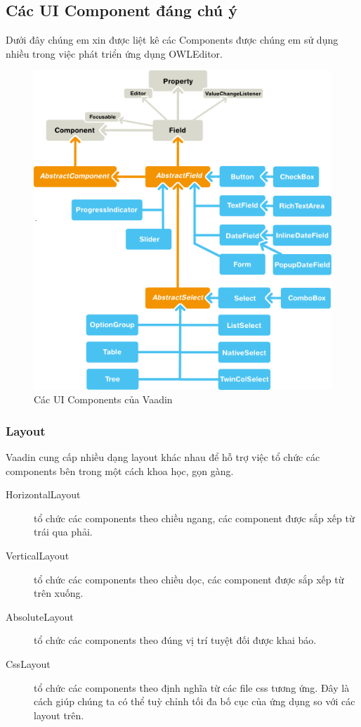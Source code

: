 \subsection{Các UI Component đáng chú ý}
Dưới đây chúng em xin được liệt kê các Components được chúng em sử dụng nhiều trong việc phát triển ứng dụng OWLEditor.
\begin{figure}[h!]
	\centering
	\includegraphics[width=120mm]{Figures/vaadin_architecture1.png}
	\caption{Các UI Components của Vaadin\label{overflow}}
\end{figure}
\subsubsection{Layout}
Vaadin cung cấp nhiều dạng layout khác nhau để hỗ trợ việc tổ chức các components bên trong một cách khoa học, gọn gàng. \cite{vaadinbook}
\begin{description}
\item[HorizontalLayout] tổ chức các components theo chiều ngang, các component được sắp xếp từ trái qua phải.
\item[VerticalLayout] tổ chức các components theo chiều dọc, các component được sắp xếp từ trên xuống.
\item[AbsoluteLayout] tổ chức các components theo đúng vị trí tuyệt đối được khai báo.
\item[CssLayout] tổ chức các components theo định nghĩa từ các file css tương ứng. Đây là cách giúp chúng ta có thể tuỳ chỉnh tối đa bố cục của ứng dụng so với các layout trên.
\end{description} 
